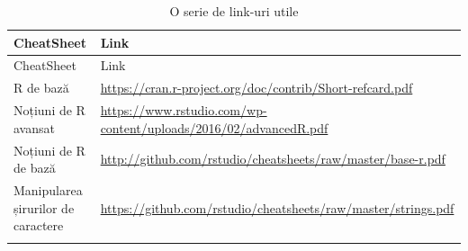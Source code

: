 \documentclass[]{article}
\begin{document}
\begin{longtable}[]{@{}ll@{}}
\caption{O serie de link-uri utile}\tabularnewline
\toprule
\begin{minipage}[b]{0.32\columnwidth}\raggedright\strut
CheatSheet\strut
\end{minipage} & \begin{minipage}[b]{0.62\columnwidth}\raggedright\strut
Link\strut
\end{minipage}\tabularnewline
\midrule
\endfirsthead
\toprule
\begin{minipage}[b]{0.32\columnwidth}\raggedright\strut
CheatSheet\strut
\end{minipage} & \begin{minipage}[b]{0.62\columnwidth}\raggedright\strut
Link\strut
\end{minipage}\tabularnewline
\midrule
\endhead
\begin{minipage}[t]{0.32\columnwidth}\raggedright\strut
R de bază\strut
\end{minipage} & \begin{minipage}[t]{0.62\columnwidth}\raggedright\strut
\url{https://cran.r-project.org/doc/contrib/Short-refcard.pdf}\strut
\end{minipage}\tabularnewline
\begin{minipage}[t]{0.32\columnwidth}\raggedright\strut
Noțiuni de R avansat\strut
\end{minipage} & \begin{minipage}[t]{0.62\columnwidth}\raggedright\strut
\url{https://www.rstudio.com/wp-content/uploads/2016/02/advancedR.pdf}\strut
\end{minipage}\tabularnewline
\begin{minipage}[t]{0.32\columnwidth}\raggedright\strut
Noțiuni de R de bază\strut
\end{minipage} & \begin{minipage}[t]{0.62\columnwidth}\raggedright\strut
\url{http://github.com/rstudio/cheatsheets/raw/master/base-r.pdf}\strut
\end{minipage}\tabularnewline
\begin{minipage}[t]{0.32\columnwidth}\raggedright\strut
Manipularea șirurilor de caractere\strut
\end{minipage} & \begin{minipage}[t]{0.62\columnwidth}\raggedright\strut
\url{https://github.com/rstudio/cheatsheets/raw/master/strings.pdf}\strut
\end{minipage}\tabularnewline
\begin{minipage}[t]{0.32\columnwidth}\raggedright\strut

\end{minipage}
\end{longtable}
\end{document}
